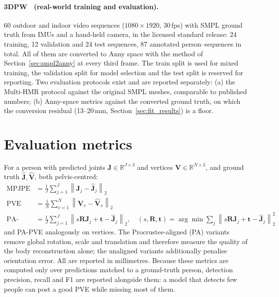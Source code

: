 \paragraph{3DPW~\cite{vonmarcard2018_3dpw} (real-world training and evaluation).}
60 outdoor and indoor video sequences ($1080{\times}1920$, 30\,fps) with SMPL
ground truth from IMUs and a hand-held camera, in the licensed standard
release: 24 training, 12 validation and 24 test sequences, 87 annotated
person--sequences in total. All of them are converted to Anny space with the
method of Section~\ref{sec:smpl2anny} at every third frame. The train split is
used for mixed training, the validation split for model selection and the
test split is reserved for reporting. Two evaluation protocols exist and are
reported separately: (a) the Multi-HMR protocol against the original SMPL
meshes, comparable to published numbers; (b) Anny-space metrics against the
converted ground truth, on which the conversion residual (13--20\,mm,
Section~\ref{sec:fit_results}) is a floor.

\section{Evaluation metrics}
\label{sec:metrics}

For a person with predicted joints $\mathbf{J}\in\mathbb{R}^{J\times3}$ and
vertices $\mathbf{V}\in\mathbb{R}^{N\times3}$, and ground truth
$\hat{\mathbf{J}},\hat{\mathbf{V}}$, both pelvis-centred:
\begin{align}
\text{MPJPE} &= \frac{1}{J}\sum_{j=1}^{J}\left\|\mathbf{J}_j-\hat{\mathbf{J}}_j\right\|_2\\
\text{PVE}   &= \frac{1}{N}\sum_{v=1}^{N}\left\|\mathbf{V}_v-\hat{\mathbf{V}}_v\right\|_2\\
\text{PA-MPJPE} &= \frac{1}{J}\sum_{j=1}^{J}\left\|s\mathbf{R}\mathbf{J}_j+\mathbf{t}-\hat{\mathbf{J}}_j\right\|_2,
\quad (s,\mathbf{R},\mathbf{t}) = \arg\min \sum_j \left\|s\mathbf{R}\mathbf{J}_j+\mathbf{t}-\hat{\mathbf{J}}_j\right\|_2^2
\end{align}
and PA-PVE analogously on vertices. The Procrustes-aligned (PA) variants remove
global rotation, scale and translation and therefore measure the quality of the
body reconstruction alone; the unaligned variants additionally penalise
orientation error. All are reported in millimetres. Because these metrics are
computed only over predictions matched to a ground-truth person, detection
precision, recall and F1 are reported alongside them: a model that detects few
people can post a good PVE while missing most of them.

